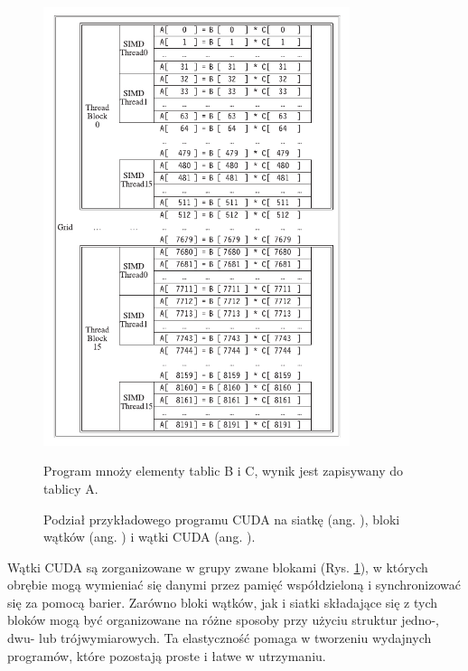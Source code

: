 \begin{figure}
      \centering
      \includegraphics[width=0.8\textwidth]{graf/CUDA-Grid.png}
      \caption {
            Podział przykładowego programu CUDA na siatkę (ang. ),
            bloki wątków (ang. ) i wątki CUDA (ang. ).
            \cite{computer-arch}
      }
      \medskip \small
      Program mnoży elementy tablic B i C, wynik jest zapisywany do tablicy A.
      \label{fig:cuda-grid}
\end{figure}

\newpage
Wątki CUDA są zorganizowane w grupy zwane blokami (Rys. \ref{fig:cuda-grid}), w których obrębie
mogą wymieniać się danymi przez pamięć współdzieloną i synchronizować się za pomocą
barier. Zarówno bloki wątków, jak i siatki składające się z tych bloków mogą być organizowane na
różne sposoby przy użyciu struktur jedno-, dwu- lub trójwymiarowych. Ta elastyczność pomaga w
tworzeniu wydajnych programów, które pozostają proste i łatwe w utrzymaniu.

